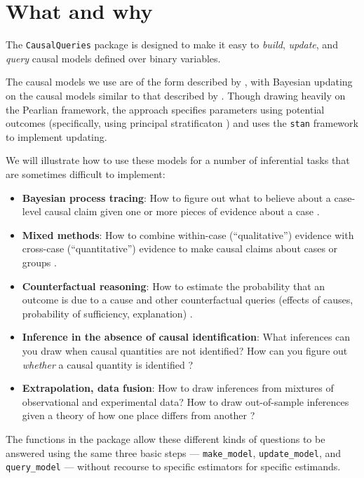 \documentclass[
  12pt,
]{book}
\providecommand{\tightlist}{%
  \setlength{\itemsep}{0pt}\setlength{\parskip}{0pt}}
\begin{document}
\hypertarget{cm}{%
\chapter{What and why}\label{cm}}

The \texttt{CausalQueries} package is designed to make it easy to \emph{build}, \emph{update}, and \emph{query} causal models defined over binary variables.

The causal models we use are of the form described by \citet{pearl2009causality}, with Bayesian updating on the causal models similar to that described by \citet{cowell1999probabilistic}. Though drawing heavily on the Pearlian framework, the approach specifies parameters using potential outcomes (specifically, using principal stratificaton \citep{frangakis2002principal}) and uses the \texttt{stan} framework \citep{carpenter2017stan} to implement updating.

We will illustrate how to use these models for a number of inferential tasks that are sometimes difficult to implement:

\begin{itemize}
\tightlist
\item
  \textbf{Bayesian process tracing}: How to figure out what to believe about a case-level causal claim given one or more pieces of evidence about a case \citep{bennett2015process}.
\item
  \textbf{Mixed methods}: How to combine within-case (``qualitative'') evidence with cross-case (``quantitative'') evidence to make causal claims about cases or groups \citep{humphreys2015mixing}.
\item
  \textbf{Counterfactual reasoning}: How to estimate the probability that an outcome is due to a cause and other counterfactual queries (effects of causes, probability of sufficiency, explanation) \citep{tian2000probabilities}.
\item
  \textbf{Inference in the absence of causal identification}: What inferences can you draw when causal quantities are not identified? How can you figure out \emph{whether} a causal quantity is identified \citep{manski1995identification}?
\item
  \textbf{Extrapolation, data fusion}: How to draw inferences from mixtures of observational and experimental data? How to draw out-of-sample inferences given a theory of how one place differs from another \citep{bareinboim2016causal}?
\end{itemize}

The functions in the package allow these different kinds of questions to be answered using the same three basic steps --- \texttt{make\_model}, \texttt{update\_model}, and \texttt{query\_model} --- without recourse to specific estimators for specific estimands.
\end{document}
